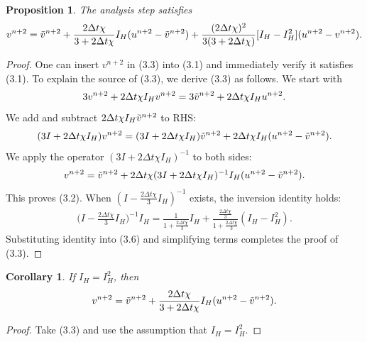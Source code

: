 \documentclass[11pt,a4paper]{article}
\newtheorem{corollary}{Corollary}[theorem]
\newtheorem{proposition}[theorem]{Proposition}
\begin{document}
\begin{proposition}
    The analysis step satisfies
    \begin{align}
        v^{n+2}=\Tilde{v}^{n+2}+\frac{2\Delta t\chi}{3+2\Delta t\chi}I_H(u^{n+2}-\Tilde{v}^{n+2})+\frac{(2\Delta t\chi)^2}{3(3+2\Delta t\chi)}[I_H-I_H^2](u^{n+2}-v^{n+2}).
    \end{align}
\end{proposition}

\begin{proof}
    One can insert $v^{n+2}$ in (3.3) into (3.1) and immediately verify it satisfies (3.1). To explain the source of (3.3), we derive (3.3) as follows. We start with 
    \begin{align}
        3v^{n+2}+2\Delta t\chi I_Hv^{n+2}=3\Tilde{v}^{n+2}+2\Delta t\chi I_Hu^{n+2}.
    \end{align}
    We add and subtract $2\Delta t\chi I_H \Tilde{v}^{n+2}$ to RHS:
    \begin{align}
        (3I+2\Delta t\chi I_H)v^{n+2}=(3I+2\Delta t\chi I_H)\Tilde{v}^{n+2}+2\Delta t\chi I_H(u^{n+2}-\Tilde{v}^{n+2}).
    \end{align}
    We apply the operator $(3I+2\Delta t\chi I_H)^{-1}$ to both sides:
    \begin{align}
        v^{n+2}=\Tilde{v}^{n+2}+2\Delta t\chi(3I+2\Delta t\chi I_H)^{-1}I_H(u^{n+2}-\Tilde{v}^{n+2}).
    \end{align}
    This proves (3.2). When $(I-\frac{2\Delta t\chi}{3}I_H)^{-1}$ exists, the inversion identity holds:
    \begin{align}
        \Bigg(I-\frac{2\Delta t\chi}{3}I_H\Bigg)^{-1}I_H=\frac{1}{1+\frac{2\Delta t\chi}{3}}I_H+\frac{\frac{2\Delta t\chi}{3}}{1+\frac{2\Delta t\chi}{3}}(I_H-I_H^2).
    \end{align}
    Substituting identity into (3.6) and simplifying terms completes the proof of (3.3).
\end{proof}

\begin{corollary}
    If $I_H=I_H^2$, then
    \begin{align}
        v^{n+2}=\Tilde{v}^{n+2}+\frac{2\Delta t\chi}{3+2\Delta t\chi}I_H(u^{n+2}-\Tilde{v}^{n+2}).
    \end{align}
\end{corollary}

\begin{proof}
    Take (3.3) and use the assumption that $I_H=I_H^2$.
\end{proof}
   
\end{document}
